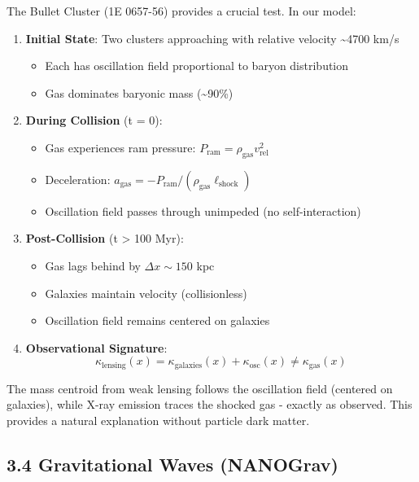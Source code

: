 \documentclass[
  11pt,
]{report}
\providecommand{\tightlist}{%
  \setlength{\itemsep}{0pt}\setlength{\parskip}{0pt}}
\begin{document}
The Bullet Cluster (1E 0657-56) provides a crucial test. In our model:

\begin{enumerate}
\def\labelenumi{\arabic{enumi}.}
\tightlist
\item
  \textbf{Initial State}: Two clusters approaching with relative
  velocity \textasciitilde4700 km/s

  \begin{itemize}
  \tightlist
  \item
    Each has oscillation field proportional to baryon distribution
  \item
    Gas dominates baryonic mass (\textasciitilde90\%)
  \end{itemize}
\item
  \textbf{During Collision} (t = 0):

  \begin{itemize}
  \tightlist
  \item
    Gas experiences ram pressure:
    \(P_\text{ram} = \rho_\text{gas} v_\text{rel}^2\)
  \item
    Deceleration:
    \(a_\text{gas} = -P_\text{ram}/(\rho_\text{gas} \ell_\text{shock})\)
  \item
    Oscillation field passes through unimpeded (no self-interaction)
  \end{itemize}
\item
  \textbf{Post-Collision} (t \textgreater{} 100 Myr):

  \begin{itemize}
  \tightlist
  \item
    Gas lags behind by \(\Delta x \sim 150\) kpc
  \item
    Galaxies maintain velocity (collisionless)
  \item
    Oscillation field remains centered on galaxies
  \end{itemize}
\item
  \textbf{Observational Signature}:
  \[\kappa_\text{lensing}(x) = \kappa_\text{galaxies}(x) + \kappa_\text{osc}(x) \neq \kappa_\text{gas}(x)\]
\end{enumerate}

The mass centroid from weak lensing follows the oscillation field
(centered on galaxies), while X-ray emission traces the shocked gas -
exactly as observed. This provides a natural explanation without
particle dark matter.

\subsection{3.4 Gravitational Waves
(NANOGrav)}\label{gravitational-waves-nanograv}
\end{document}
